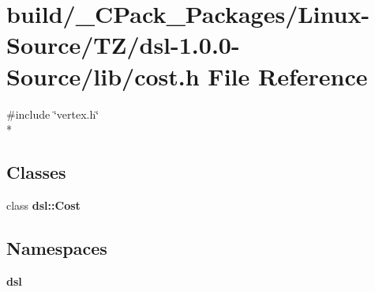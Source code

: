 \section{build/\-\_\-\-C\-Pack\-\_\-\-Packages/\-Linux-\/\-Source/\-T\-Z/dsl-\/1.0.0-\/\-Source/lib/cost.h File Reference}
\label{build_2__CPack__Packages_2Linux-Source_2TZ_2dsl-1_80_80-Source_2lib_2cost_8h}
{\ttfamily \#include \char`\"{}vertex.\-h\char`\"{}}\\*
\subsection*{Classes}
\begin{DoxyCompactItemize}
\item 
class {\bf dsl\-::\-Cost}
\end{DoxyCompactItemize}
\subsection*{Namespaces}
\begin{DoxyCompactItemize}
\item 
{\bf dsl}
\end{DoxyCompactItemize}
